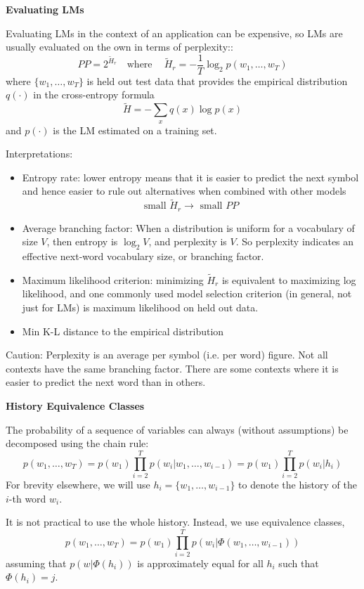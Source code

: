 \documentclass[11pt,titlepage]{article}
\begin{document}
\clearpage

\centerline{{\huge \bf Evaluating LMs}}
\vskip 0.2in

Evaluating LMs in the context of an application can be expensive, so 
LMs are usually evaluated on the own in terms of perplexity::
$$PP = 2^{\tilde H_r} \quad \mbox{where}\ \quad 
\tilde H_r = -\frac{1}{T}\log_2 p(w_1,\ldots , w_T)$$
where $\{ w_1, \ldots , w_T\}$ is held out test  data that provides
the empirical distribution $q(\cdot)$ in the cross-entropy formula
$$\tilde H = - \sum_x q(x)\log p(x)$$
and $p(\cdot)$ is the LM estimated on a training set.
\vskip 0.1in

Interpretations:
\begin{itemize}
\item Entropy rate: lower entropy means that it is easier to predict the
next symbol and hence easier to rule out alternatives when combined with other models
$$\mbox{small } \tilde H_r \rightarrow \mbox{ small } PP$$
\item Average branching factor: When a distribution is uniform for a vocabulary
of size $V$, then entropy is $\log_2 V$, and perplexity is $V$.  So perplexity
indicates an effective next-word vocabulary size, or branching factor.
\item Maximum likelihood criterion:  minimizing $\tilde H_r$ is equivalent to
maximizing log likelihood, and one commonly used model selection criterion (in
general, not just for LMs) is maximum likelihood on held out data.
\item Min K-L distance to the empirical distribution
\end{itemize}

{\Large Caution: Perplexity is an average per symbol (i.e. per word) figure.  Not all
contexts have the same branching factor. There are some contexts where it is easier to predict the next word
than in others.}


\clearpage



\centerline{{\huge \bf History Equivalence Classes}}
\vskip 0.2in

The probability of a sequence of variables can always (without assumptions)
be decomposed using the chain rule:
$$p(w_1, \ldots , w_T) = p(w_1)\prod_{i=2}^T p(w_i|w_1, \ldots , w_{i-1})
  = p(w_1)\prod_{i=2}^T p(w_i|h_i)$$
For brevity elsewhere, we will use $h_i = \{ w_1, \ldots , w_{i-1} \}$ to
denote the history of the $i$-th word $w_i$.
\vskip 0.1in

It is not practical to use the whole history.  Instead, we use equivalence
classes,
$$p(w_1, \ldots , w_T) = p(w_1)\prod_{i=2}^T p(w_i|\Phi(w_1, \ldots , w_{i-1}))$$
assuming that $p(w|\Phi(h_i))$ is approximately equal for all $h_i$ such that
$\Phi(h_i) = j$.
\vskip 0.1in
\end{document}
